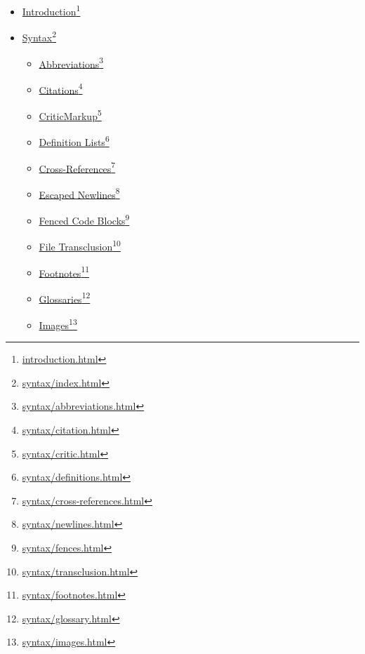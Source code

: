 \begin{itemize}
\item \href{introduction.html}{Introduction}\footnote{\href{introduction.html}{introduction.html}}

\item \href{syntax/index.html}{Syntax}\footnote{\href{syntax/index.html}{syntax\slash index.html}}

\begin{itemize}
\item \href{syntax/abbreviations.html}{Abbreviations}\footnote{\href{syntax/abbreviations.html}{syntax\slash abbreviations.html}}

\item \href{syntax/citation.html}{Citations}\footnote{\href{syntax/citation.html}{syntax\slash citation.html}}

\item \href{syntax/critic.html}{CriticMarkup}\footnote{\href{syntax/critic.html}{syntax\slash critic.html}}

\item \href{syntax/definitions.html}{Definition Lists}\footnote{\href{syntax/definitions.html}{syntax\slash definitions.html}}

\item \href{syntax/cross-references.html}{Cross-References}\footnote{\href{syntax/cross-references.html}{syntax\slash cross-references.html}}

\item \href{syntax/newlines.html}{Escaped Newlines}\footnote{\href{syntax/newlines.html}{syntax\slash newlines.html}}

\item \href{syntax/fences.html}{Fenced Code Blocks}\footnote{\href{syntax/fences.html}{syntax\slash fences.html}}

\item \href{syntax/transclusion.html}{File Transclusion}\footnote{\href{syntax/transclusion.html}{syntax\slash transclusion.html}}

\item \href{syntax/footnotes.html}{Footnotes}\footnote{\href{syntax/footnotes.html}{syntax\slash footnotes.html}}

\item \href{syntax/glossary.html}{Glossaries}\footnote{\href{syntax/glossary.html}{syntax\slash glossary.html}}

\item \href{syntax/images.html}{Images}\footnote{\href{syntax/images.html}{syntax\slash images.html}}


\end{itemize}
\end{itemize}
